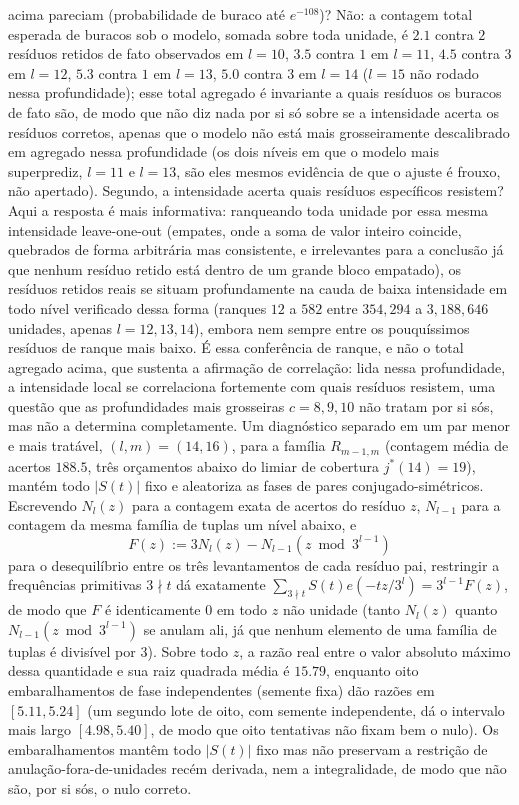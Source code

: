 \documentclass[11pt]{amsart}
\theoremstyle{plain}
\theoremstyle{definition}
\theoremstyle{remark}
\begin{document}
acima pareciam (probabilidade de buraco até $e^{-108}$)? Não: a contagem total esperada de buracos
sob o modelo, somada sobre toda unidade, é $2.1$ contra $2$ resíduos retidos de fato observados em
$l=10$, $3.5$ contra $1$ em $l=11$, $4.5$ contra $3$ em $l=12$, $5.3$ contra $1$ em $l=13$, $5.0$
contra $3$ em $l=14$ ($l=15$ não rodado nessa profundidade); esse total agregado é invariante a
quais resíduos os buracos de fato são, de modo que não diz nada por si só sobre se a intensidade
acerta os resíduos corretos, apenas que o modelo não está mais grosseiramente descalibrado em
agregado nessa profundidade (os dois níveis em que o modelo mais superprediz, $l=11$ e $l=13$, são
eles mesmos evidência de que o ajuste é frouxo, não apertado). Segundo, a intensidade acerta quais
resíduos específicos resistem? Aqui a resposta é mais informativa: ranqueando toda unidade por essa
mesma intensidade leave-one-out (empates, onde a soma de valor inteiro coincide, quebrados de forma
arbitrária mas consistente, e irrelevantes para a conclusão já que nenhum resíduo retido está
dentro de um grande bloco empatado), os resíduos retidos reais se situam profundamente na cauda de
baixa intensidade em todo nível verificado dessa forma (ranques $12$ a $582$ entre $354{,}294$ a
$3{,}188{,}646$ unidades, apenas $l=12,13,14$), embora nem sempre entre os pouquíssimos resíduos de
ranque mais baixo. É essa conferência de ranque, e não o total agregado acima, que sustenta a
afirmação de correlação: lida nessa profundidade, a intensidade local se correlaciona fortemente
com quais resíduos resistem, uma questão que as profundidades mais grosseiras $c=8,9,10$ não
tratam por si sós, mas não a determina completamente. Um diagnóstico separado em um par menor e
mais tratável, $(l,m)=(14,16)$, para a família $R_{m-1,m}$ (contagem média de acertos $188.5$, três
orçamentos abaixo do limiar de cobertura $j^*(14)=19$), mantém todo $|S(t)|$ fixo e aleatoriza as
fases de pares conjugado-simétricos. Escrevendo $N_l(z)$ para a contagem exata de acertos do
resíduo $z$, $N_{l-1}$ para a contagem da mesma família de tuplas um nível abaixo, e
\[
F(z) := 3N_l(z)-N_{l-1}(z\bmod3^{l-1})
\]
para o desequilíbrio entre os três levantamentos de cada resíduo pai, restringir a frequências
primitivas $3\nmid t$ dá exatamente $\sum_{3\nmid t}S(t)e(-tz/3^l) = 3^{l-1}F(z)$, de modo que $F$
é identicamente $0$ em todo $z$ não unidade (tanto $N_l(z)$ quanto $N_{l-1}(z\bmod3^{l-1})$ se
anulam ali, já que nenhum elemento de uma família de tuplas é divisível por $3$). Sobre todo $z$, a
razão real entre o valor absoluto máximo dessa quantidade e sua raiz quadrada média é $15.79$,
enquanto oito embaralhamentos de fase independentes (semente fixa) dão razões em $[5.11,5.24]$ (um
segundo lote de oito, com semente independente, dá o intervalo mais largo $[4.98,5.40]$, de modo
que oito tentativas não fixam bem o nulo). Os embaralhamentos mantêm todo $|S(t)|$ fixo mas não
preservam a restrição de anulação-fora-de-unidades recém derivada, nem a integralidade, de modo que
não são, por si sós, o nulo correto.
\end{document}
